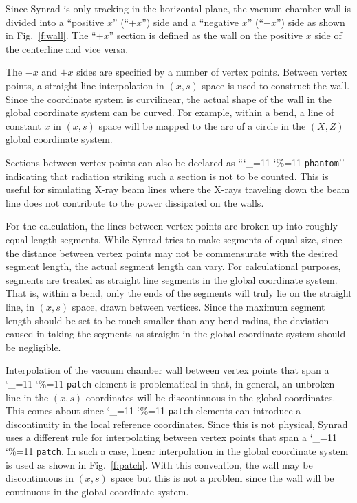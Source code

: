 \documentclass[11pt]{article}
\newcommand\ttcmd{\begingroup\catcode`\_=11 \catcode`\%=11 \dottcmd}
\newcommand\dottcmd[1]{\texttt{#1}\endgroup}
\newcommand{\vn}{\ttcmd}
\begin{document}
Since Synrad is only tracking in the horizontal plane, the vacuum
chamber wall is divided into a ``positive $x$'' (``$+x$'') side and a
``negative $x$'' (``$-x$'') side as shown in Fig.~\ref{f:wall}. The
``$+x$'' section is defined as the wall on the positive $x$ side of
the centerline and vice versa. 

The $-x$ and $+x$ sides are specified by a number of vertex
points. Between vertex points, a straight line interpolation in $(x,
s)$ space is used to construct the wall. Since the coordinate system
is curvilinear, the actual shape of the wall in the global coordinate
system can be curved. For example, within a bend, a line of constant
$x$ in $(x, s)$ space will be mapped to the arc of a circle in the
$(X, Z)$ global coordinate system.

Sections between vertex points can also be declared as
``\vn{phantom}'' indicating that radiation striking such a section is
not to be counted. This is useful for simulating X-ray beam lines
where the X-rays traveling down the beam line does not contribute to
the power dissipated on the walls.

For the calculation, the lines between vertex points are broken up
into roughly equal length segments. While Synrad tries to make
segments of equal size, since the distance between vertex points may
not be commensurate with the desired segment length, the actual
segment length can vary. For calculational purposes, segments are
treated as straight line segments in the global coordinate
system. That is, within a bend, only the ends of the segments will
truly lie on the straight line, in $(x, s)$ space, drawn between
vertices. Since the maximum segment length should be set to be much
smaller than any bend radius, the deviation caused in taking the
segments as straight in the global coordinate system should be
negligible.

Interpolation of the vacuum chamber wall between vertex points that
span a \vn{patch} element is problematical in that, in general, an
unbroken line in the $(x, s)$ coordinates will be discontinuous in the
global coordinates. This comes about since \vn{patch} elements can
introduce a discontinuity in the local reference coordinates. Since
this is not physical, Synrad uses a different rule for interpolating
between vertex points that span a \vn{patch}. In such a case, linear
interpolation in the global coordinate system is used as shown in
Fig.~\ref{f:patch}. With this convention, the wall may be
discontinuous in $(x, s)$ space but this is not a problem since the
wall will be continuous in the global coordinate system.
\end{document}
